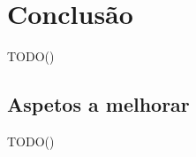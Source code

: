 %
%
\chapter{Conclusão} \label{cap4}

TODO()

%
%
\section{Aspetos a melhorar} \label{sec31}

TODO()